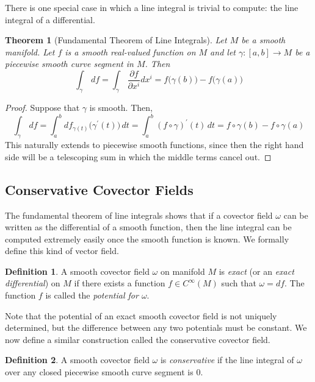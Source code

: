 \documentclass{article}
\newtheorem{theorem}{Theorem}[section]
\theoremstyle{remark}
\theoremstyle{definition}
\newtheorem{definition}{Definition}[section]
\begin{document}
    There is one special case in which a line integral is trivial to compute: the line integral of a differential. 

    \begin{theorem}[Fundamental Theorem of Line Integrals]
    Let $M$ be a smooth manifold. Let $f$ is a smooth real-valued function on $M$ and let $\gamma: [a,b] \longrightarrow M$ be a piecewise smooth curve segment in $M$. Then 
    \[\int_\gamma \,df = \int_\gamma \, \frac{\partial f}{\partial x^i} dx^i = f\big(\gamma(b)\big) - f\big(\gamma(a)\big)\]
    \end{theorem}
    \begin{proof}
    Suppose that $\gamma$ is smooth. Then, 
    \[\int_\gamma\,df = \int_a^b df_{\gamma(t)} \big( \gamma^\prime (t) \big) \,dt = \int_a^b (f \circ \gamma)^\prime (t) \,dt = f \circ \gamma (b) - f \circ \gamma (a)\]
    This naturally extends to piecewise smooth functions, since then the right hand side will be a telescoping sum in which the middle terms cancel out. 
    \end{proof}

  \subsection{Conservative Covector Fields}

    The fundamental theorem of line integrals shows that if a covector field $\omega$ can be written as the differential of a smooth function, then the line integral can be computed extremely easily once the smooth function is known. We formally define this kind of vector field. 

    \begin{definition}
    A smooth covector field $\omega$ on manifold $M$ is \textit{exact} (or an \textit{exact differential}) on $M$ if there exists a function $f \in C^\infty (M)$ such that $\omega = df$. The function $f$ is called the \textit{potential for $\omega$}. 
    \end{definition}

    Note that the potential of an exact smooth covector field is not uniquely determined, but the difference between any two potentials must be constant. We now define a similar construction called the conservative covector field. 

    \begin{definition}
    A smooth covector field $\omega$ is \textit{conservative} if the line integral of $\omega$ over any closed piecewise smooth curve segment is $0$. 
    \end{definition}
\end{document}
